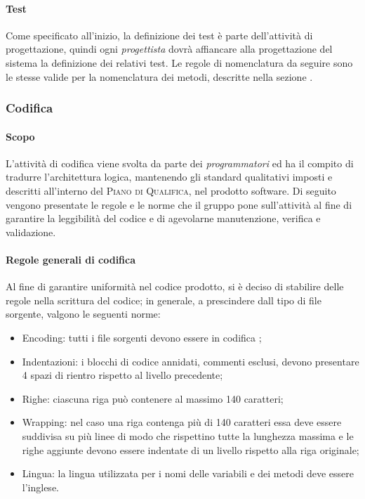 \paragraph{Test}

Come specificato all'inizio, la definizione dei test è parte dell'attività di progettazione, quindi ogni 
\emph{progettista} dovrà affiancare alla progettazione del sistema la definizione dei relativi test. Le regole di 
nomenclatura da seguire sono le stesse valide per la nomenclatura dei metodi, descritte nella sezione 
.

\subsubsection{Codifica}
 
\paragraph{Scopo}
\label{par:codifica:scopo}

L'attività di codifica viene svolta da parte dei \emph{programmatori} ed ha il compito di tradurre l'architettura logica, mantenendo gli 
standard qualitativi imposti e descritti all'interno del \textsc{Piano di Qualifica}, nel prodotto software. Di seguito vengono presentate 
le regole e le norme che il gruppo pone sull'attività al fine di garantire la leggibilità del codice e di agevolarne manutenzione, 
verifica e validazione.

\paragraph{Regole generali di codifica}
\label{par:stile_codifica}

Al fine di garantire uniformità nel codice prodotto, si è deciso di stabilire delle regole nella scrittura del codice; in generale, a 
prescindere dall tipo di file sorgente, valgono le seguenti norme:
\begin{itemize}
	\item Encoding: tutti i file sorgenti devono essere in codifica ;
    \item Indentazioni: i blocchi di codice annidati, commenti esclusi, devono presentare 4 spazi di rientro rispetto al livello precedente;
    \item Righe: ciascuna riga può contenere al massimo 140 caratteri;
    \item Wrapping: nel caso una riga contenga più di 140 caratteri essa deve essere suddivisa su più linee di modo che rispettino tutte 
    	la lunghezza massima e le righe aggiunte devono essere indentate di un livello rispetto alla riga originale;
    \item Lingua: la lingua utilizzata per i nomi delle variabili e dei metodi deve essere l'inglese.
\end{itemize}




